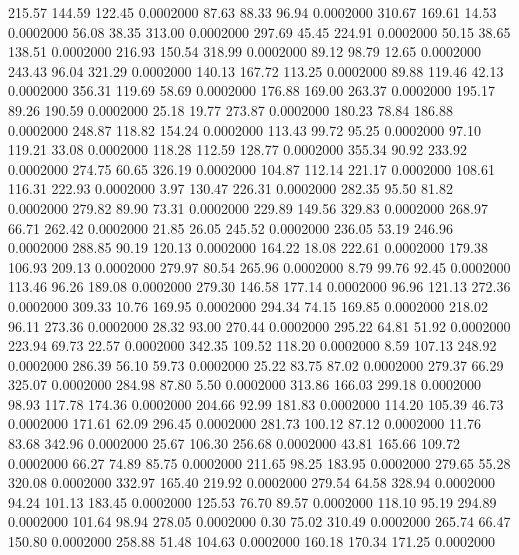  215.57  144.59  122.45   0.0002000
  87.63   88.33   96.94   0.0002000
 310.67  169.61   14.53   0.0002000
  56.08   38.35  313.00   0.0002000
 297.69   45.45  224.91   0.0002000
  50.15   38.65  138.51   0.0002000
 216.93  150.54  318.99   0.0002000
  89.12   98.79   12.65   0.0002000
 243.43   96.04  321.29   0.0002000
 140.13  167.72  113.25   0.0002000
  89.88  119.46   42.13   0.0002000
 356.31  119.69   58.69   0.0002000
 176.88  169.00  263.37   0.0002000
 195.17   89.26  190.59   0.0002000
  25.18   19.77  273.87   0.0002000
 180.23   78.84  186.88   0.0002000
 248.87  118.82  154.24   0.0002000
 113.43   99.72   95.25   0.0002000
  97.10  119.21   33.08   0.0002000
 118.28  112.59  128.77   0.0002000
 355.34   90.92  233.92   0.0002000
 274.75   60.65  326.19   0.0002000
 104.87  112.14  221.17   0.0002000
 108.61  116.31  222.93   0.0002000
   3.97  130.47  226.31   0.0002000
 282.35   95.50   81.82   0.0002000
 279.82   89.90   73.31   0.0002000
 229.89  149.56  329.83   0.0002000
 268.97   66.71  262.42   0.0002000
  21.85   26.05  245.52   0.0002000
 236.05   53.19  246.96   0.0002000
 288.85   90.19  120.13   0.0002000
 164.22   18.08  222.61   0.0002000
 179.38  106.93  209.13   0.0002000
 279.97   80.54  265.96   0.0002000
   8.79   99.76   92.45   0.0002000
 113.46   96.26  189.08   0.0002000
 279.30  146.58  177.14   0.0002000
  96.96  121.13  272.36   0.0002000
 309.33   10.76  169.95   0.0002000
 294.34   74.15  169.85   0.0002000
 218.02   96.11  273.36   0.0002000
  28.32   93.00  270.44   0.0002000
 295.22   64.81   51.92   0.0002000
 223.94   69.73   22.57   0.0002000
 342.35  109.52  118.20   0.0002000
   8.59  107.13  248.92   0.0002000
 286.39   56.10   59.73   0.0002000
  25.22   83.75   87.02   0.0002000
 279.37   66.29  325.07   0.0002000
 284.98   87.80    5.50   0.0002000
 313.86  166.03  299.18   0.0002000
  98.93  117.78  174.36   0.0002000
 204.66   92.99  181.83   0.0002000
 114.20  105.39   46.73   0.0002000
 171.61   62.09  296.45   0.0002000
 281.73  100.12   87.12   0.0002000
  11.76   83.68  342.96   0.0002000
  25.67  106.30  256.68   0.0002000
  43.81  165.66  109.72   0.0002000
  66.27   74.89   85.75   0.0002000
 211.65   98.25  183.95   0.0002000
 279.65   55.28  320.08   0.0002000
 332.97  165.40  219.92   0.0002000
 279.54   64.58  328.94   0.0002000
  94.24  101.13  183.45   0.0002000
 125.53   76.70   89.57   0.0002000
 118.10   95.19  294.89   0.0002000
 101.64   98.94  278.05   0.0002000
   0.30   75.02  310.49   0.0002000
 265.74   66.47  150.80   0.0002000
 258.88   51.48  104.63   0.0002000
 160.18  170.34  171.25   0.0002000
